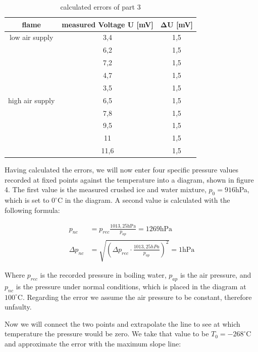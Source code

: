 \documentclass{article}
\begin{document}
\begin{table}[!ht]
    \centering
    \begin{tabular}{c|c|c}
        \textbf{flame} & \textbf{measured Voltage $\bm{U}$} [mV] & $\bm{\Delta U}$ [mV] \\ \hline
        low air supply & 3,4 & 1,5 \\ 
        ~ & 6,2 & 1,5 \\ 
        ~ & 7,2 & 1,5 \\ 
        ~ & 4,7 & 1,5 \\ 
        ~ & 3,5 & 1,5 \\ \hline
        high air supply & 6,5 & 1,5 \\ 
        ~ & 7,8 & 1,5 \\ 
        ~ & 9,5 & 1,5 \\ 
        ~ & 11 & 1,5 \\ 
        ~ & 11,6 & 1,5 \\ 
    \end{tabular}
    \caption{calculated errors of part 3}
\end{table}

\newpage

Having calculated the errors, we will now enter four specific pressure values recorded at fixed points against the temperature into a diagram, shown in figure 4. The first value is the measured crushed ice and water mixture, $p_0 = 916$hPa, which is set to $0^{\circ}$C in the diagram. A second value is calculated with the following formula:

\begin{equation}
\begin{split}
    p_{nc} &= p_{rec} \frac{1013,25\text{hPa}}{p_{ap}} = 1269 \text{hPa} \\
    \Delta p_{nc} &= \sqrt{\left( \Delta p_{rec} \cdot \frac{1013,25hPa}{p_{ap}} \right)^2} = 1 \text{hPa}
\end{split}
\end{equation}

Where $p_{rec}$ is the recorded pressure in boiling water, $p_{ap}$ is the air pressure, and $p_{nc}$ is the pressure under normal conditions, which is placed in the diagram at $100^{\circ}$C. Regarding the error we assume the air pressure to be constant, therefore unfaulty.

Now we will connect the two points and extrapolate the line to see at which temperature the pressure would be zero. We take that value to be $T_0 = -268^{\circ}$C and approximate the error with the maximum slope line:
\end{document}
